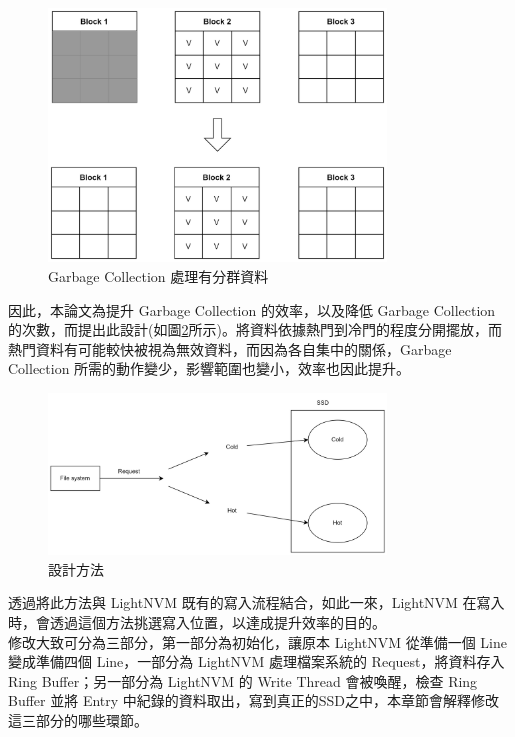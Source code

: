 \begin{figure}[H]
    \centering
    \includegraphics[width=0.8\textwidth]{picture/ch3/gc_efficiency_2.png}
    \caption{Garbage Collection 處理有分群資料}
    \label{f3.2}
\end{figure}

\indent
因此，本論文為提升 Garbage Collection 的效率，以及降低 Garbage Collection 的次數，而提出此設計(如圖\ref{f3.3}所示)。將資料依據熱門到冷門的程度分開擺放，而熱門資料有可能較快被視為無效資料，而因為各自集中的關係，Garbage Collection 所需的動作變少，影響範圍也變小，效率也因此提升。
\begin{figure}[H]
    \centering
    \includegraphics[width=0.8\textwidth]{picture/ch3/method.png}
    \caption{設計方法}
    \label{f3.3}
\end{figure}

透過將此方法與 LightNVM 既有的寫入流程結合，如此一來，LightNVM 在寫入時，會透過這個方法挑選寫入位置，以達成提升效率的目的。\\
\indent
修改大致可分為三部分，第一部分為初始化，讓原本 LightNVM 從準備一個 Line 變成準備四個 Line，一部分為 LightNVM 處理檔案系統的 Request，將資料存入 Ring Buffer；另一部分為 LightNVM 的 Write Thread 會被喚醒，檢查 Ring Buffer 並將 Entry 中紀錄的資料取出，寫到真正的SSD之中，本章節會解釋修改這三部分的哪些環節。

